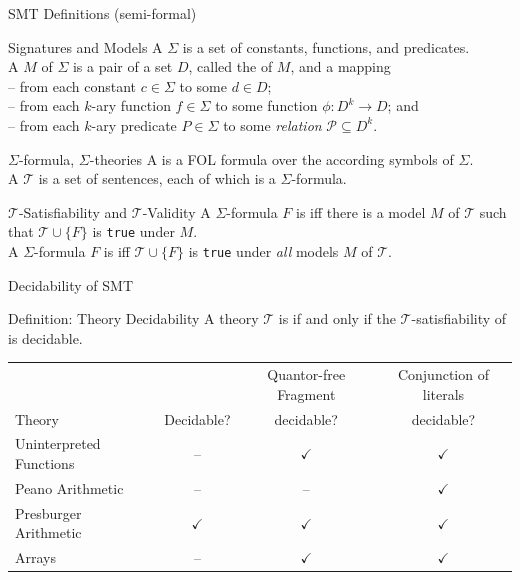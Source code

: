 \documentclass[t,english]{sdqbeamer}
\begin{document}
\begin{frame}{SMT Definitions (semi-formal)}
	
	\vspace*{-4mm}
	\begin{block}{Signatures and Models}
		A  $\Sigma$ is a set of constants, functions, and predicates.\\
		A  $M$ of $\Sigma$ is a pair of a set $D$, called the  of $M$, and a mapping\\
		-- from each constant $c \in \Sigma$ to some $d \in D$;\\
		-- from each $k$-ary function $f \in \Sigma$ to some function $\phi : D^k \rightarrow D$; and\\
		-- from each $k$-ary predicate $P \in \Sigma$ to some \textit{relation} $\mathcal{P} \subseteq D^k$.
	\end{block}
	\begin{block}{$\Sigma$-formula, $\Sigma$-theories}
		A  is a FOL formula over the according symbols of $\Sigma$.\\
		A  $\mathcal{T}$ is a set of sentences, each of which is a $\Sigma$-formula.\\
	\end{block}
	\begin{block}{$\mathcal{T}$-Satisfiability and $\mathcal{T}$-Validity}
		A $\Sigma$-formula $F$ is  iff there is a model $M$ of $\mathcal{T}$ such that $\mathcal{T} \cup \{F\}$ is \texttt{true} under $M$.\\
		A $\Sigma$-formula $F$ is  iff $\mathcal{T} \cup \{F\}$ is \texttt{true} under \textit{all} models $M$ of $\mathcal{T}$.
	\end{block}
\end{frame}

\begin{frame}{Decidability of SMT}
	\begin{block}{Definition: Theory Decidability}
		A theory $\mathcal{T}$ is  if and only if the $\mathcal{T}$-satisfiability of  is decidable.
	\end{block}
	
	\vspace*{5mm}
	\centering
	\begin{tabular}{lccc}
		\toprule
		& & Quantor-free Fragment & Conjunction of literals \\
		Theory & Decidable? & decidable? & decidable?\\
		\midrule
		Uninterpreted Functions   & -- & $\checkmark$ & $\checkmark$ \\
		Peano Arithmetic          & -- & --  & $\checkmark$\\
		Presburger Arithmetic     & $\checkmark$ & $\checkmark$  & $\checkmark$\\
		Arrays					  & -- & $\checkmark$  & $\checkmark$\\
	\end{tabular}
\end{frame}
\end{document}
